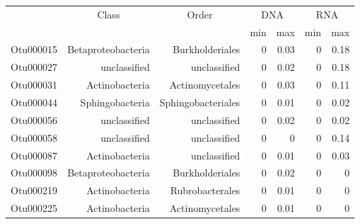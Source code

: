 \begin{table}[ht]
\centering
\begin{tabular}{crrrrrr}
  \hline
  & \multicolumn{1}{c}{Class} & \multicolumn{1}{c}{Order} & 
                      \multicolumn{2}{c}{DNA} & \multicolumn{2}{c}{RNA} \\
 & &  & min & max & min & max \\
 \hline
Otu000015 & Betaproteobacteria & Burkholderiales & 0 & 0.03 & 0 & 0.18 \\ 
  Otu000027 & unclassified & unclassified & 0 & 0.02 & 0 & 0.18 \\ 
  Otu000031 & Actinobacteria & Actinomycetales & 0 & 0.03 & 0 & 0.11 \\ 
  Otu000044 & Sphingobacteria & Sphingobacteriales & 0 & 0.01 & 0 & 0.02 \\ 
  Otu000056 & unclassified & unclassified & 0 & 0.02 & 0 & 0.02 \\ 
  Otu000058 & unclassified & unclassified & 0 & 0 & 0 & 0.14 \\ 
  Otu000087 & Actinobacteria & unclassified & 0 & 0.01 & 0 & 0.03 \\ 
  Otu000098 & Betaproteobacteria & Burkholderiales & 0 & 0.02 & 0 & 0 \\ 
  Otu000219 & Actinobacteria & Rubrobacterales & 0 & 0.01 & 0 & 0 \\ 
  Otu000225 & Actinobacteria & Actinomycetales & 0 & 0.01 & 0 & 0 \\ 
   \hline
\end{tabular}
\end{table}
